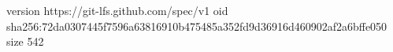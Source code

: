 version https://git-lfs.github.com/spec/v1
oid sha256:72da0307445f7596a63816910b475485a352fd9d36916d460902af2a6bffe050
size 542
